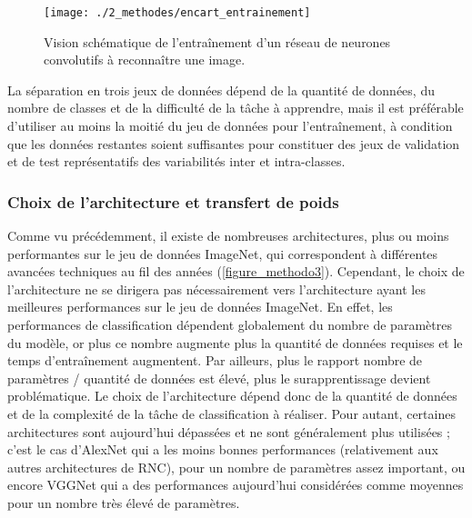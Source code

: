 \begin{sidewaysfigure}
\begin{figure}[H]
	\begin{center}
	\texttt{[image: ./2\_methodes/encart\_entrainement]}
		\caption[Vision schématique de l’entraînement d’un réseau de neurones convolutifs à reconnaître une image]{Vision schématique de l’entraînement d’un réseau de neurones convolutifs à reconnaître une image.}
	\label{figure_methodo4}
\end{center}
\end{figure}
\end{sidewaysfigure}

La séparation en trois jeux de données dépend de la quantité de données, du nombre de classes et de la difficulté de la tâche à apprendre, mais il est préférable d’utiliser au moins la moitié du jeu de données pour l’entraînement, à condition que les données restantes soient suffisantes pour constituer des jeux de validation et de test représentatifs des variabilités inter et intra-classes.

\subsubsection{Choix de l’architecture et transfert de poids}

Comme vu précédemment, il existe de nombreuses architectures, plus ou moins performantes sur le jeu de données ImageNet, qui correspondent à différentes avancées techniques au fil des années (\autoref{figure_methodo3}). Cependant, le choix de l’architecture ne se dirigera pas nécessairement vers l’architecture ayant les meilleures performances sur le jeu de données ImageNet. En effet, les performances de classification dépendent globalement du nombre de paramètres du modèle, or plus ce nombre augmente plus la quantité de données requises et le temps d’entraînement augmentent. Par ailleurs, plus le rapport nombre de paramètres / quantité de données est élevé, plus le surapprentissage devient problématique. Le choix de l’architecture dépend donc de la quantité de données et de la complexité de la tâche de classification à réaliser. Pour autant, certaines architectures sont aujourd’hui dépassées et ne sont généralement plus utilisées ; c’est le cas d’AlexNet qui a les moins bonnes performances (relativement aux autres architectures de RNC), pour un nombre de paramètres assez important, ou encore VGGNet qui a des performances aujourd’hui considérées comme moyennes pour un nombre très élevé de paramètres.

